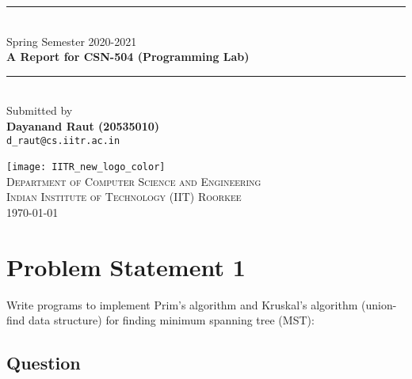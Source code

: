 \documentclass[11pt,a4paper]{article}
\newcommand{\HRule}{\rule{\linewidth}{0.5mm}}
\begin{document}
\begin{titlepage}
\begin{center}


\HRule \\[0.4cm]
{ 
Spring Semester 2020-2021\\[0.2cm]
\large{\bf A Report for CSN-504 (Programming Lab)}\\[0.4cm]
}
\HRule \\[1.5cm]

Submitted by\\[0.5cm]
{
{\bf Dayanand Raut (20535010)}\\[0.1cm]
\texttt{d\_raut@cs.iitr.ac.in}\\[0.1cm]
}

\vfill

\texttt{[image: IITR\_new\_logo\_color]}~\\[0.5cm]
\textsc{\large Department of Computer Science and Engineering}\\[0.2cm]
\textsc{\large Indian Institute of Technology (IIT) Roorkee}\\[0.2cm]

{\large \today}
 
\end{center}
\end{titlepage}


\newpage

\tableofcontents
{}
\newpage
\setcounter{page}{1}

\section{Problem Statement 1}\label{sec:problem1}
Write programs to implement Prim’s algorithm and Kruskal’s algorithm (union-find data structure)
for finding minimum spanning tree (MST):
\subsection{Question}\label{sec:question1}
\end{document}
